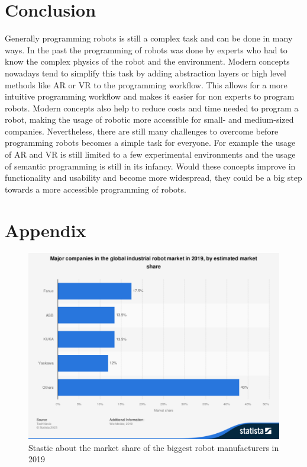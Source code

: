 \documentclass[conference]{IEEEtran}
\begin{document}
\section{Conclusion}

    Generally programming robots is still a complex task and can be done in many ways. 
    In the past the programming of robots was done by experts who had to know the complex physics of the robot and the environment. Modern concepts nowadays tend to simplify this task by adding abstraction layers or high level methods like AR or VR to the programming workflow. This allows for a more intuitive programming workflow and makes it easier for non experts to program robots. Modern concepts also help to reduce costs and time needed to program a robot, making the usage of robotic more accessible for small- and medium-sized companies.
    Nevertheless, there are still many challenges to overcome before programming robots becomes a simple task for everyone. For example the usage of AR and VR is still limited to a few experimental environments and the usage of semantic programming is still in its infancy. Would these concepts improve in functionality and usability and become more widespread, they could be a big step towards a more accessible programming of robots.

\nocite{*}





\cleardoublepage
\appendix

\section{Appendix}
    \begin{figure}[htbp!]
        \centering
        \includegraphics[scale=0.25]{./Moderne_Konzepte_Quellen/Citavi Attachments/statistic_id317178_global-industrial-robot-market-major-companies-by-market-share-2019.pdf}
        \caption{Stastic about the market share of the biggest robot manufacturers in 2019 \cite{s1}}
        \label{fig}
    \end{figure}
\end{document}
